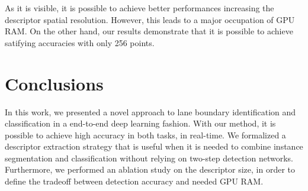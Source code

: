 \documentclass[runningheads]{llncs}
\begin{document}
As it is visible, it is possible to achieve better performances increasing the descriptor spatial resolution. However, this leads to a major occupation of GPU RAM. On the other hand, our results demonstrate that it is possible to achieve satifying accuracies with only 256 points. 
 
\section{Conclusions}
In this work, we presented a novel approach to lane boundary identification and classification in a end-to-end deep learning fashion. With our method, it is possible to achieve high accuracy in both tasks, in real-time. We formalized a descriptor extraction strategy that is useful when it is needed to combine instance segmentation and classification without relying on two-step detection networks. Furthermore, we performed an ablation study on the descriptor size, in order to define the tradeoff between detection accuracy and needed GPU RAM. 
 



\end{document}
